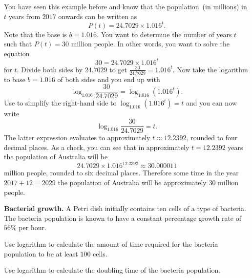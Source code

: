 \documentclass[a4paper,oneside,12pt]{article}
\begin{document}
\begin{solution}
You have seen this example before and know that the population~(in
millions) in $t$ years from $2017$ onwards can be written as
\[
P(t)
=
24.7029 \times 1.016^t.
\]
Note that the base is $b = 1.016$.  You want to determine the number
of years $t$ such that $P(t) = 30$ million people.  In other words,
you want to solve the equation
\[
30
=
24.7029 \times 1.016^t
\]
for $t$.  Divide both sides by $24.7029$ to get
$\frac{30}{24.7029} = 1.016^t$.  Now take the logarithm to base
$b = 1.016$ of both sides and you end up with
\[
\log_{1.016} \frac{30}{24.7029}
=
\log_{1.016} (1.016^t).
\]
Use  to simplify the right-hand
side to $\log_{1.016} (1.016^t) = t$ and you can now write
\begin{equation}
\label{eqn:logarithm:Australia_population_doubling_time}
\log_{1.016} \frac{30}{24.7029}
=
t.
\end{equation}
The latter expression evaluates to approximately $t \approx 12.2392$,
rounded to four decimal places.  As a check, you can see that in
approximately $t = 12.2392$ years the population of Australia will be
\[
24.7029 \times 1.016^{12.2392}
\approx
30.000011
\]
million people, rounded to six decimal places.  Therefore some time in
the year $2017 + 12 = 2029$ the population of Australia will be
approximately $30$ million people.
\end{solution}

\begin{exercise}
\textbf{Bacterial growth.}
A Petri dish initially contains ten cells of a type of bacteria.  The
bacteria population is known to have a constant percentage growth rate
of $56\%$ per hour.
\begin{packedenum}
\item\label{subex:logarithm:bacterial_growth_at_least_100_cells}
  Use logarithm to calculate the amount of time required for the
  bacteria population to be at least $100$ cells.

\item\label{subex:logarithm:bacterial_growth_doubling_time}
  Use logarithm to calculate the doubling time of the bacteria
  population.
\end{packedenum}
\end{exercise}
\end{document}

